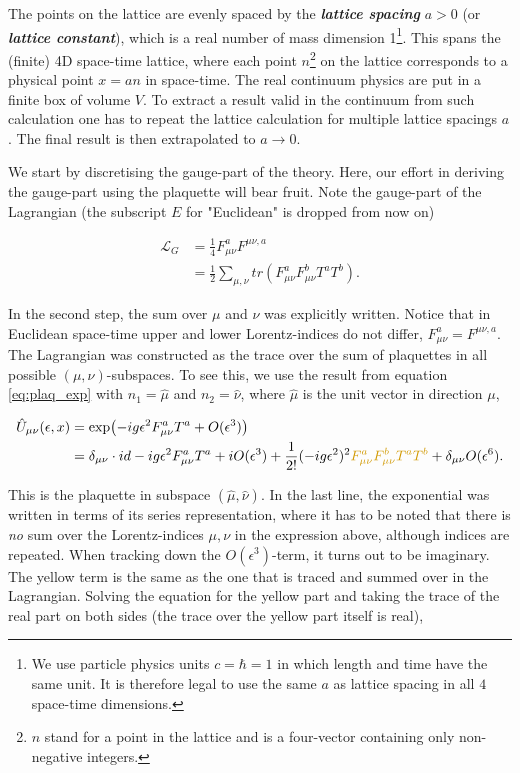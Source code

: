\documentclass{article}
\theoremstyle{plain} %
\theoremstyle{convention} %
\theoremstyle{remark} %
\def\df#1{\textbf{\textit{#1}}}
\numberwithin{equation}{section}
\begin{document}
The points on the lattice are evenly spaced by the \df{lattice spacing} $a > 0$ (or \df{lattice constant}), which is a real number of mass dimension 1\footnote{We use particle physics units $c = \hbar = 1$ in which length and time have the same unit. It is therefore legal to use the same $a$ as lattice spacing in all $4$ space-time dimensions.}. This spans the (finite) 4D space-time lattice, where each point $n$\footnote{$n$ stand for a point in the lattice and is a four-vector containing only non-negative integers.} on the lattice corresponds to a physical point $x = an$ in space-time. The real continuum physics are put in a finite box of volume $V$. To extract a result valid in the continuum from such calculation one has to repeat the lattice calculation for multiple lattice spacings $a$. The final result is then extrapolated to $a \to 0$.

We start by discretising the gauge-part of the theory. Here, our effort in deriving the gauge-part using the plaquette will bear fruit. Note the gauge-part of the Lagrangian (the subscript $E$ for "Euclidean" is dropped from now on)

\begin{align*}
    \mathcal{L}_G &= \frac{1}{4} F_{\mu \nu}^a F^{\mu \nu, a} \\
    &= \frac{1}{2} \sum_{\mu, \nu} tr( F_{\mu \nu}^a F_{\mu \nu}^b T^a T^b).
\end{align*}

In the second step, the sum over $\mu$ and $\nu$ was explicitly written. Notice that in Euclidean space-time upper and lower Lorentz-indices do not differ, $F_{\mu \nu}^a = F^{\mu \nu, a}$. The Lagrangian was constructed as the trace over the sum of plaquettes in all possible $(\mu, \nu)$-subspaces. To see this, we use the result from equation \eqref{eq:plaq_exp} with $n_1 = \hat{\mu}$ and $n_2 = \hat{\nu}$, where $\hat{\mu}$ is the unit vector in direction $\mu$,

\begin{align*}
    \hat{U}_{\mu \nu}(\epsilon,x) &= \exp(-ig \epsilon^2 F_{\mu \nu}^a T^a + O(\epsilon^3) ) \\
    &= \delta_{\mu \nu} \cdot id -ig \epsilon^2 F_{\mu \nu}^a T^a + i O(\epsilon^3) + \frac{1}{2!}(-ig \epsilon^2)^2 \textcolor{cyellow}{F_{\mu \nu}^a F_{\mu \nu}^b T^a T^b } + \delta_{\mu \nu} O(\epsilon^6).
\end{align*}

This is the plaquette in subspace $(\hat{\mu}, \hat{\nu})$. In the last line, the exponential was written in terms of its series representation, where it has to be noted that there is \textit{no} sum over the Lorentz-indices $\mu,\nu$ in the expression above, although indices are repeated. When tracking down the $O(\epsilon^3)$-term, it turns out to be imaginary. The \textcolor{cyellow}{yellow} term is the same as the one that is traced and summed over in the Lagrangian. Solving the equation for the yellow part and taking the trace of the real part on both sides (the trace over the yellow part itself is real),
\end{document}
